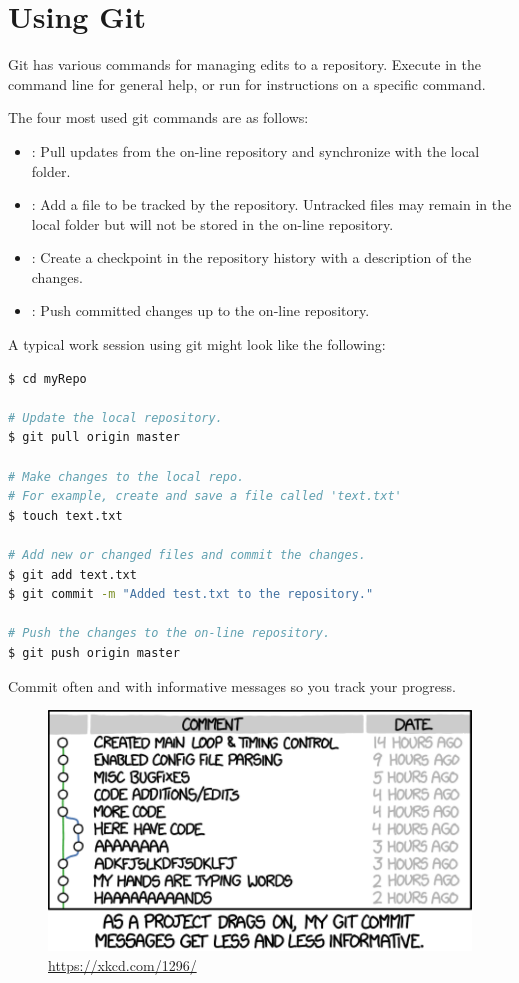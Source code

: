 \section*{Using Git} %

Git has various commands for managing edits to a repository.
Execute  in the command line for general help, or run  for instructions on a specific command.

The four most used git commands are as follows:
\begin{itemize}
\item {}: Pull updates from the on-line repository and synchronize with the local folder.
\item {}: Add a file to be tracked by the repository. Untracked files may remain in the local folder but will not be stored in the on-line repository.
\item {}: Create a checkpoint in the repository history with a description of the changes.
\item {}: Push committed changes up to the on-line repository.
\end{itemize}
A typical work session using git might look like the following:

\begin{lstlisting}[language=bash]
$ cd myRepo

# Update the local repository.
$ git pull origin master

# Make changes to the local repo.
# For example, create and save a file called 'text.txt'
$ touch text.txt

# Add new or changed files and commit the changes.
$ git add text.txt
$ git commit -m "Added test.txt to the repository."

# Push the changes to the on-line repository.
$ git push origin master
\end{lstlisting}

Commit often and with informative messages so you track your progress.

\begin{figure}[H]
\centering
\includegraphics[width=.7\textwidth]{xkcd2.pdf}
\caption{\url{https://xkcd.com/1296/}}
\end{figure}

